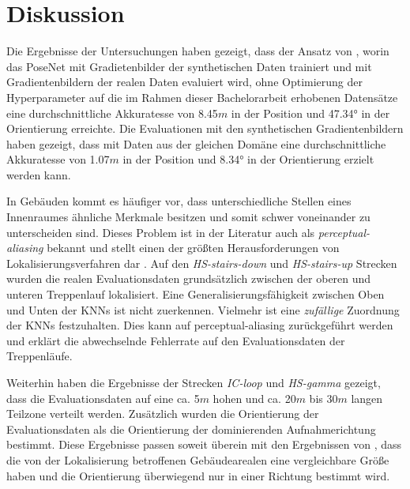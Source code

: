 
\section{Diskussion}
\label{sec:kapitel_5}


Die Ergebnisse der Untersuchungen haben gezeigt, dass der Ansatz von \citet{acharyaBIMPoseNetIndoorCamera2019}, worin das PoseNet mit Gradietenbilder der synthetischen Daten trainiert und mit Gradientenbildern der realen Daten evaluiert wird, ohne Optimierung der Hyperparameter auf die im Rahmen dieser Bachelorarbeit erhobenen Datensätze eine durchschnittliche Akkuratesse von 8.45$m$ in der Position und 47.34° in der Orientierung erreichte. Die Evaluationen mit den synthetischen Gradientenbildern haben gezeigt, dass mit Daten aus der gleichen Domäne eine durchschnittliche Akkuratesse von 1.07$m$ in der Position und 8.34° in der Orientierung erzielt werden kann. 


In Gebäuden kommt es häufiger vor, dass unterschiedliche Stellen eines Innenraumes ähnliche Merkmale besitzen und somit schwer voneinander zu unterscheiden sind. Dieses Problem ist in der Literatur auch als \textit{perceptual-aliasing} bekannt und stellt einen der größten Herausforderungen von Lokalisierungsverfahren dar \cite{lowryVisualPlaceRecognition2016}. Auf den \textit{HS-stairs-down} und \textit{HS-stairs-up} Strecken wurden die realen Evaluationsdaten grundsätzlich zwischen der oberen und unteren Treppenlauf lokalisiert. Eine Generalisierungsfähigkeit zwischen Oben und Unten der KNNs ist nicht zuerkennen. Vielmehr ist eine \textit{zufällige} Zuordnung der KNNs festzuhalten. Dies kann auf perceptual-aliasing zurückgeführt werden und erklärt die abwechselnde Fehlerrate auf den Evaluationsdaten der Treppenläufe.

Weiterhin haben die Ergebnisse der Strecken \textit{IC-loop} und \textit{HS-gamma} gezeigt, dass die Evaluationsdaten auf eine ca. 5$m$ hohen und ca. 20$m$ bis 30$m$ langen Teilzone verteilt werden. Zusätzlich wurden die Orientierung der Evaluationsdaten als die Orientierung der dominierenden Aufnahmerichtung bestimmt. Diese Ergebnisse passen soweit überein mit den Ergebnissen von \citet{acharyaBIMPoseNetIndoorCamera2019}, dass die von der Lokalisierung betroffenen Gebäudearealen eine vergleichbare Größe haben und die Orientierung überwiegend nur in einer Richtung bestimmt wird.

